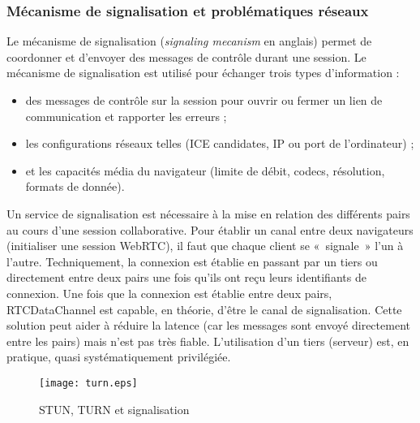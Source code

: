 \subsubsection{Mécanisme de signalisation et problématiques réseaux}
Le mécanisme de signalisation (\textit{signaling mecanism} en anglais) 
permet de coordonner et d'envoyer des messages de contrôle durant une 
session. Le mécanisme de signalisation est utilisé pour échanger trois 
types d'information : 
\begin{itemize}
	\item des messages de contrôle sur la session pour ouvrir ou fermer un 
	lien de communication et rapporter les erreurs ;
	\item les configurations réseaux telles (ICE candidates, IP ou
	port de l'ordinateur) ; 
	\item et les capacités média du navigateur (limite de débit, codecs, 
	résolution, formats de donnée).
\end{itemize}
Un service de signalisation est nécessaire à la mise en relation des 
différents pairs au cours d'une session collaborative. 
Pour établir un canal entre deux navigateurs (initialiser une session 
WebRTC), il faut que chaque client se «~signale~» l'un à l'autre. 
Techniquement, la connexion est établie en passant par 
un tiers ou directement entre deux pairs une fois qu'ils ont reçu leurs 
identifiants de connexion. 
Une fois que la connexion est établie entre deux pairs, 
RTCDataChannel est capable, en théorie, d'être le canal de signalisation. 
Cette solution peut aider à réduire la latence (car les messages sont 
envoyé directement entre les pairs) mais n'est pas très fiable. L'utilisation 
d'un tiers (serveur) est, en pratique, quasi systématiquement privilégiée.

\begin{figure}[hbt]
	\centering
	\texttt{[image: turn.eps]}
	\caption{STUN, TURN et signalisation}
	\label{fig:turn}
\end{figure} 

